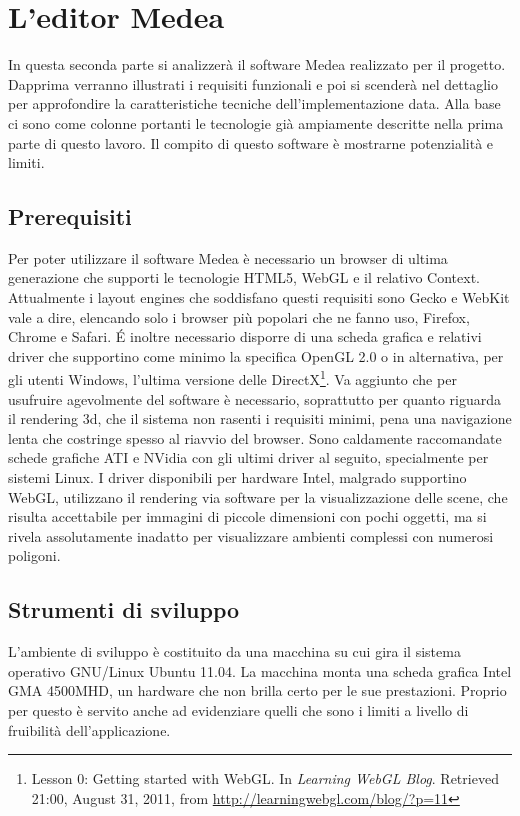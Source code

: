 \chapter{L'editor Medea}                 

In questa seconda parte si analizzerà il software Medea realizzato per il progetto. Dapprima verranno illustrati i requisiti funzionali e poi si scenderà nel dettaglio per approfondire la caratteristiche tecniche dell'implementazione data. Alla base ci sono come colonne portanti le tecnologie già ampiamente descritte nella prima parte di questo lavoro. Il compito di questo software è mostrarne potenzialità e limiti.


\section{Prerequisiti}
Per poter utilizzare il software Medea è necessario un browser di ultima ge\-nerazione che supporti le tecnologie HTML5, WebGL e il relativo Context. Attualmente i layout engines che soddisfano questi requisiti sono Gecko e WebKit vale a dire, elencando solo i browser più popolari che ne fanno uso, Firefox, Chrome e Safari. 
\'{E} inoltre necessario disporre di una scheda grafica e relativi driver che supportino come minimo la specifica OpenGL 2.0 o in alternativa, per gli utenti Windows, l'ultima versione delle DirectX\footnote{Lesson 0: Getting started with WebGL. In \textit{Learning WebGL Blog}. Retrieved 21:00, August 31, 2011, from \url{http://learningwebgl.com/blog/?p=11}}. Va aggiunto che per usufruire agevolmente del software è necessario, soprattutto per quanto riguarda il rendering 3d, che il sistema non rasenti i requisiti minimi, pena una navigazione lenta che costringe spesso al riavvio del browser. Sono caldamente raccomandate schede grafiche ATI e NVidia con gli ultimi driver al seguito, specialmente per sistemi Linux. I driver disponibili per hardware Intel, malgrado supportino WebGL, utilizzano il rendering via software per la visualizzazione delle scene, che risulta accettabile per immagini di piccole dimensioni con pochi oggetti, ma si rivela assolutamente inadatto per visualizzare ambienti complessi con numerosi poligoni.


\section{Strumenti di sviluppo}
L'ambiente di sviluppo è costituito da una macchina su cui gira il si\-stema operativo GNU/Linux Ubuntu 11.04. La macchina monta una scheda grafica Intel GMA 4500MHD, un hardware che non brilla certo per le sue prestazioni. Proprio per questo è servito anche ad evidenziare quelli che sono i limiti a livello di fruibilità dell'applicazione.

